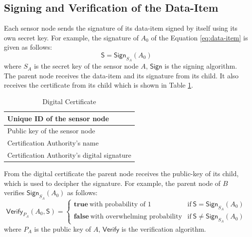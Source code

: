 	\subsection{Signing and Verification of the Data-Item}
		\label{subsection:Signing and Verification of the Data-Item}
		Each sensor node sends the signature of its data-item signed by itself using its own secret key. 
		For example, the signature of $A_{0}$ of the Equation \ref{eq:data-item} is given as follows:
		\begin{equation}
			\label{eq:sign-data-item}
			\textsf{S} = \textsf{Sign}_{S_{A}}(A_{0})
		\end{equation}
		where $S_{A}$ is the secret key of the sensor node $A$, $\textsf{Sign}$ is the signing algorithm.
		The parent node receives the data-item and its signature from its child. 
		It also receives the certificate from its child which is shown in Table \ref{table:digital-certificate}.
		\begin{table}[!htb]	
			\begin{center}
				\begin{tabular}{ |l| }
			    \hline
			    Unique ID of the sensor node \\
			    \hline
			    Public key of the sensor node \\	
			    \hline
			    Certification Authority's name \\
			    \hline
			    Certification Authority's digital signature \\
			    \hline
				\end{tabular}
			\end{center}
	  	\caption{Digital Certificate}
		  \label{table:digital-certificate}
	  \end{table}
	  From the digital certificate the parent node receives the public-key of its child, which is used to decipher the signature.
	  For example, the parent node of $B$ verifies $\textsf{Sign}_{S_{A}}(A_{0})$ as follows:
	  \begin{equation}
			\textsf{Verify}_{P_{A}}(A_{0},\textsf{S}) = 
			\begin{cases}
			 \textbf{true}\ \mbox{with probability of 1} & \mbox{if}\ \textsf{S} = \textsf{Sign}_{S_{A}}(A_{0})\\
			 \textbf{false}\ \mbox{with overwhelming probability} & \mbox{if}\ \textsf{S} \neq \textsf{Sign}_{S_{A}}(A_{0})
			\end{cases}
			\label{eq:verification}
		\end{equation}
	  where $P_{A}$ is the public key of $A$, $\textsf{Verify}$ is the verification algorithm.
	
